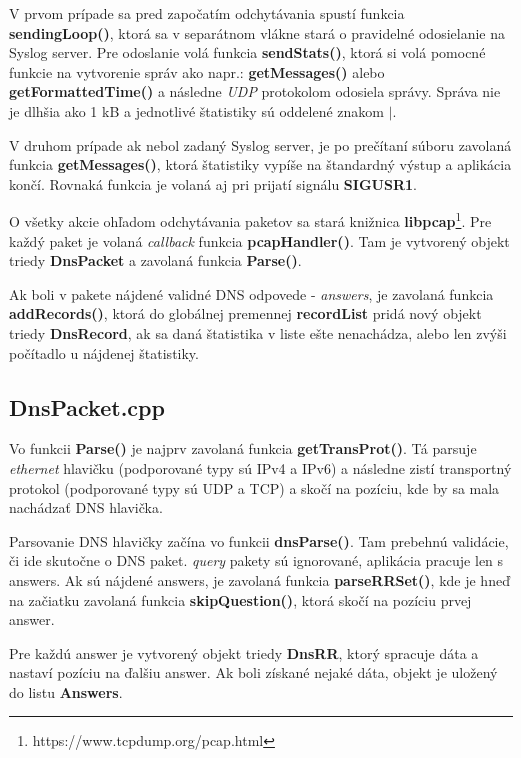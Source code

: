 \documentclass{article}
\begin{document}
        V prvom prípade sa pred započatím odchytávania spustí funkcia \textbf{sendingLoop()},
        ktorá sa v separátnom vlákne stará o pravidelné odosielanie na Syslog server. Pre odoslanie volá funkcia \textbf{sendStats()}, ktorá si volá
        pomocné funkcie na vytvorenie správ ako napr.: \textbf{getMessages()} alebo \textbf{getFormattedTime()} a následne \emph{UDP} protokolom 
        odosiela správy. Správa nie je dlhšia ako 1 kB a jednotlivé štatistiky sú oddelené znakom $\vert$.

        V druhom prípade ak nebol zadaný Syslog server, je po prečítaní súboru zavolaná funkcia \textbf{getMessages()}, ktorá štatistiky vypíše
        na štandardný výstup a aplikácia končí. Rovnaká funkcia je volaná aj pri prijatí signálu \textbf{SIGUSR1}.

        O všetky akcie ohľadom odchytávania paketov sa stará knižnica \textbf{libpcap}\footnote{https://www.tcpdump.org/pcap.html}. Pre každý paket
        je volaná \emph{callback} funkcia \textbf{pcapHandler()}. Tam je vytvorený objekt triedy \textbf{DnsPacket} a zavolaná funkcia \textbf{Parse()}.

        Ak boli v pakete nájdené validné DNS odpovede - \emph{answers}, je zavolaná funkcia \textbf{addRecords()}, ktorá do globálnej premennej \textbf{recordList} pridá nový
        objekt triedy \textbf{DnsRecord}, ak sa daná štatistika v liste ešte nenachádza, alebo len zvýši počítadlo u nájdenej štatistiky.

        \subsection{DnsPacket.cpp}
        Vo funkcii \textbf{Parse()} je najprv zavolaná funkcia \textbf{getTransProt()}. Tá parsuje \emph{ethernet} hlavičku (podporované typy sú IPv4 a IPv6)
        a následne zistí transportný protokol (podporované typy sú UDP a TCP) a skočí na pozíciu, kde by sa mala nachádzať DNS hlavička.

        Parsovanie DNS hlavičky začína vo funkcii \textbf{dnsParse()}. Tam prebehnú validácie, či ide skutočne o DNS paket. \emph{query} pakety sú
        ignorované, aplikácia pracuje len s answers. Ak sú nájdené answers, je zavolaná funkcia \textbf{parseRRSet()}, kde je hneď na začiatku zavolaná funkcia \textbf{skipQuestion()}, ktorá
        skočí na pozíciu prvej answer.

        Pre každú answer je vytvorený objekt triedy \textbf{DnsRR}, ktorý spracuje dáta a nastaví pozíciu na ďalšiu answer. Ak boli získané nejaké dáta, objekt je uložený do listu
        \textbf{Answers}.
\end{document}

